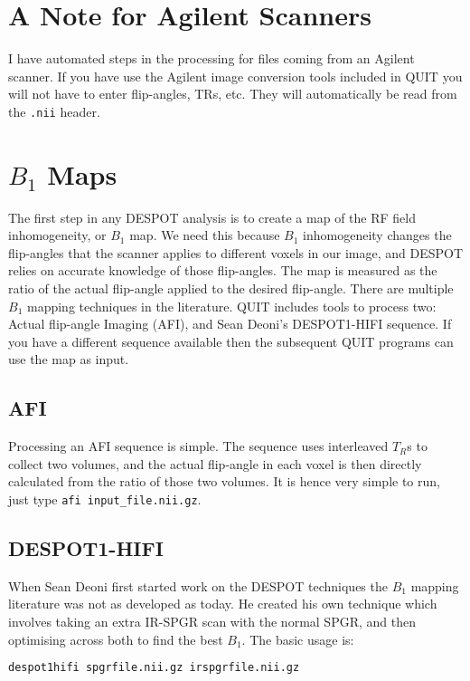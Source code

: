 \documentclass{report}
\begin{document}
\section{A Note for Agilent Scanners}

I have automated steps in the processing for files coming from an Agilent scanner. If you have use the Agilent image conversion tools included in QUIT you will not have to enter flip-angles, TRs, etc. They will automatically be read from the \texttt{.nii} header.

\section{$B_1$ Maps}

The first step in any DESPOT analysis is to create a map of the RF field inhomogeneity, or $B_1$ map. We need this because $B_1$ inhomogeneity changes the flip-angles that the scanner applies to different voxels in our image, and DESPOT relies on accurate knowledge of those flip-angles. The map is measured as the ratio of the actual flip-angle applied to the desired flip-angle. There are multiple $B_1$ mapping techniques in the literature. QUIT includes tools to process two: Actual flip-angle Imaging (AFI), and Sean Deoni's DESPOT1-HIFI sequence. If you have a different sequence available then the subsequent QUIT programs can use the map as input.

\subsection{AFI}

Processing an AFI sequence is simple. The sequence uses interleaved $T_R$s to collect two volumes, and the actual flip-angle in each voxel is then directly calculated from the ratio of those two volumes. It is hence very simple to run, just type \texttt{afi input\_file.nii.gz}.

\subsection{DESPOT1-HIFI}

When Sean Deoni first started work on the DESPOT techniques the $B_1$ mapping literature was not as developed as today. He created his own technique which involves taking an extra IR-SPGR scan with the normal SPGR, and then optimising across both to find the best $B_1$. The basic usage is:

\begin{lstlisting}[language=sh]
despot1hifi spgrfile.nii.gz irspgrfile.nii.gz
\end{lstlisting}
\end{document}
